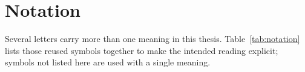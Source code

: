 \documentclass[12pt]{article}
\begin{document}
{}
\printbibliography        %

\newpage
\appendix
{}
{}

\section{Notation}\label{app:notation}

Several letters carry more than one meaning in this thesis.  Table~\ref{tab:notation} lists those reused symbols together to make the intended reading explicit; symbols not listed here are used with a single meaning.
\end{document}
